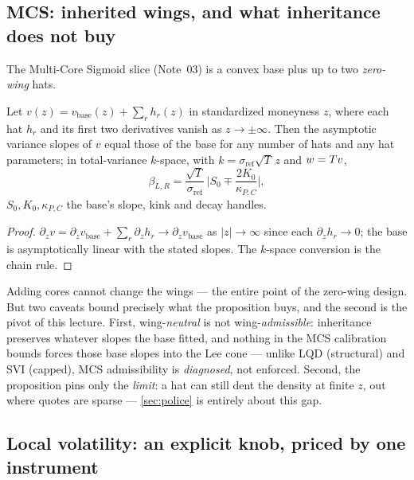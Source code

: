 \documentclass[11pt]{article}
\begin{document}
\subsection{MCS: inherited wings, and what inheritance does not buy}

The Multi-Core Sigmoid slice (Note~03) is a convex base plus up to two
\emph{zero-wing} hats.

\begin{proposition}
\label{prop:zerowing}
Let $v(z)=v_{\mathrm{base}}(z)+\sum_r h_r(z)$ in standardized moneyness
$z$, where each hat $h_r$ and its first two derivatives vanish as
$z\to\pm\infty$.  Then the asymptotic variance slopes of $v$ equal those
of the base for any number of hats and any hat parameters; in
total-variance $k$-space, with $k=\sigma_{\mathrm{ref}}\sqrt T\,z$ and
$w=Tv$,
\begin{equation}
\beta_{L,R}
=\frac{\sqrt T}{\sigma_{\mathrm{ref}}}\,
\Big|S_0\mp\frac{2K_0}{\kappa_{P,C}}\Big| ,
\label{eq:siv_wings}
\end{equation}
$S_0,K_0,\kappa_{P,C}$ the base's slope, kink and decay handles.
\end{proposition}

\begin{proof}
$\partial_z v=\partial_z v_{\mathrm{base}}+\sum_r\partial_z h_r\to
\partial_z v_{\mathrm{base}}$ as $|z|\to\infty$ since each
$\partial_z h_r\to0$; the base is asymptotically linear with the stated
slopes.  The $k$-space conversion is the chain rule.
\end{proof}

Adding cores cannot change the wings --- the entire point of the
zero-wing design.  But two caveats bound precisely what the proposition
buys, and the second is the pivot of this lecture.  First,
wing-\emph{neutral} is not wing-\emph{admissible}: inheritance preserves
whatever slopes the base fitted, and nothing in the MCS calibration
bounds forces those base slopes into the Lee cone --- unlike LQD
(structural) and SVI (capped), MCS admissibility is \emph{diagnosed},
not enforced.  Second, the proposition pins only the \emph{limit}: a
hat can still dent the density at finite $z$, out where quotes are
sparse --- \cref{sec:police} is entirely about this gap.

\subsection{Local volatility: an explicit knob, priced by one instrument}
\end{document}
